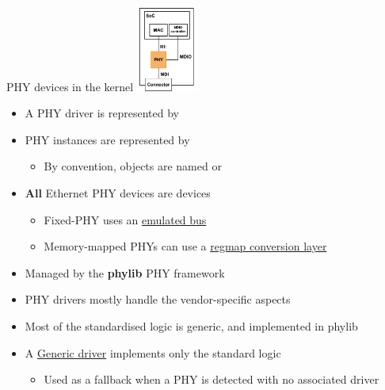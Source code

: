 \begin{frame}{PHY devices in the kernel}
	\hfill
	\includegraphics[width=0.15\textwidth]{slides/networking-driver-phy/phy.pdf}
	\vspace{-3cm}
	\begin{itemize}
		\item A PHY driver is represented by 
		\item PHY instances are represented by 
			\begin{itemize}
				\item By convention, objects are named  or 
			\end{itemize}
		\item \textbf{All} Ethernet PHY devices are  devices
			\begin{itemize}
				\item Fixed-PHY uses an \href{https://elixir.bootlin.com/linux/v6.15.1/source/drivers/net/phy/swphy.c}{emulated bus}
				\item Memory-mapped PHYs can use a \href{https://elixir.bootlin.com/linux/v6.15.1/source/drivers/net/mdio/mdio-regmap.c}{regmap conversion layer}
			\end{itemize}
		\item Managed by the \textbf{phylib} PHY framework
		\item PHY drivers mostly handle the vendor-specific aspects
		\item Most of the standardised logic is generic, and implemented in phylib
		\item A \href{https://elixir.bootlin.com/linux/v6.15.1/source/drivers/net/phy/phy_device.c\#L3510}{Generic driver} implements only the standard logic
			\begin{itemize}
				\item Used as a fallback when a PHY is detected with no associated driver
			\end{itemize}
	\end{itemize}
\end{frame}

